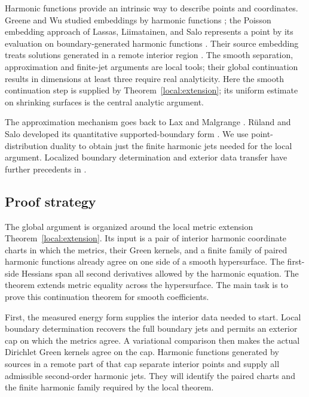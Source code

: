 Harmonic functions provide an intrinsic way to describe points and
coordinates. Greene and Wu studied embeddings by harmonic functions
\cite{GreeneWu1975}; the Poisson embedding approach of Lassas,
Liimatainen, and Salo represents a point by its evaluation on
boundary-generated harmonic functions \cite{LLS20}. Their source
embedding treats solutions generated in a remote interior region
\cite[Section~6.1]{LLS20}. The smooth separation, approximation and
finite-jet arguments are local tools; their global continuation results
in dimensions at least three require real analyticity. Here the smooth
continuation step is supplied by
Theorem~\ref{local:extension}; its uniform estimate on shrinking
surfaces is the central analytic argument.

The approximation mechanism goes back to Lax and Malgrange
\cite{Lax1956,Malgrange1956}. R\"uland and Salo developed its
quantitative supported-boundary form \cite{RulandSalo2019}.
We use point-distribution duality to obtain just the finite harmonic
jets needed for the local argument. Localized boundary determination
and exterior data transfer have further precedents in
\cite{AlessandriniGaburro2009,AlessandriniKim2012}.

\subsection{Proof strategy}

The global argument is organized around the local metric extension
Theorem~\ref{local:extension}. Its input is a pair of interior harmonic
coordinate charts in which the metrics, their Green kernels, and a
finite family of paired harmonic functions already agree on one side of
a smooth hypersurface. The first-side Hessians span all second derivatives
allowed by the harmonic equation. The theorem extends metric equality
across the hypersurface. The main task is to prove this continuation theorem for
smooth coefficients.

First, the measured energy form supplies the interior data needed to
start. Local boundary determination recovers the full boundary jets
and permits an exterior cap on which the metrics agree. A variational
comparison then makes the actual Dirichlet Green kernels agree on the
cap. Harmonic functions generated by sources in a remote part of that
cap separate interior points and supply all admissible second-order
harmonic jets. They will identify the paired charts and the finite
harmonic family required by the local theorem.

